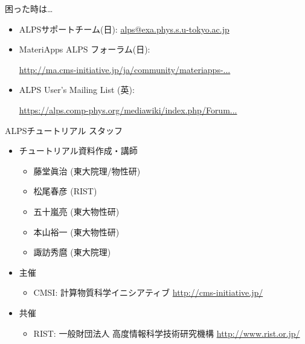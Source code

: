\begin{frame}{困った時は…}
  \begin{itemize}
    \setlength{\itemsep}{1em}
  \item ALPSサポートチーム(日): {\footnotesize \href{mailto:alps@exa.phys.s.u-tokyo.ac.jp}{alps@exa.phys.s.u-tokyo.ac.jp}}
  \item MateriApps ALPS フォーラム(日):

    {\footnotesize \href{http://ma.cms-initiative.jp/ja/community/materiapps-messageboard/alps}{http://ma.cms-initiative.jp/ja/community/materiapps-...}}
  \item ALPS User's Mailing List (英):

    {\footnotesize \href{https://alps.comp-phys.org/mediawiki/index.php/Forum:Overview}{https://alps.comp-phys.org/mediawiki/index.php/Forum...}}
  \end{itemize}
\end{frame}

\begin{frame}{ALPSチュートリアル スタッフ}
  \begin{itemize}
  \item チュートリアル資料作成・講師
    \begin{itemize}
    \item 藤堂眞治 (東大院理/物性研)
    \item 松尾春彦 (RIST)
    \item 五十嵐亮 (東大物性研)
    \item 本山裕一 (東大物性研)
    \item 諏訪秀麿 (東大院理)
    \end{itemize}
  \item 主催
    \begin{itemize}
    \item CMSI: 計算物質科学イニシアティブ \url{http://cms-initiative.jp/}
    \end{itemize}
  \item 共催
    \begin{itemize}
    \item RIST: 一般財団法人 高度情報科学技術研究機構 \url{http://www.rist.or.jp/}
    \end{itemize}
  \end{itemize}
\end{frame}

